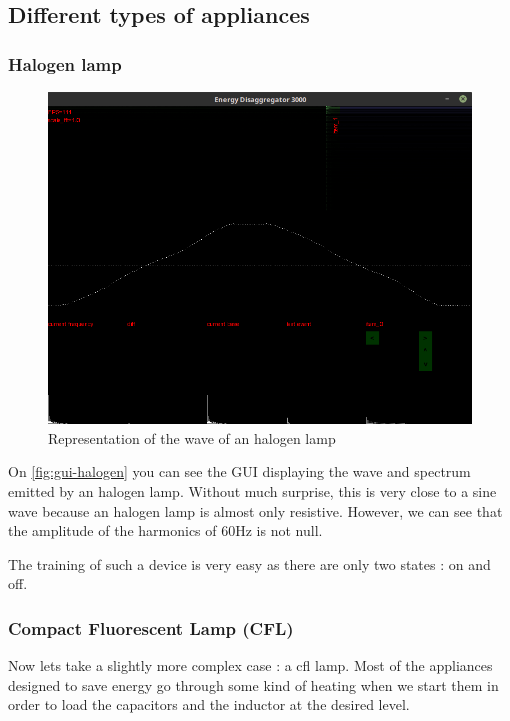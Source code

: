 \subsection{Different types of appliances}\label{section:appliances}
\subsubsection{Halogen lamp}
\begin{figure}
    \centering
    \includegraphics[trim={0 7cm 0 7cm},clip,width=\textwidth,decodearray={1 0 1 0 1 0}]{img/gui-halogen.png}
    \caption{Representation of the wave of an halogen lamp}
    \label{fig:gui-halogen}
\end{figure}
On \autoref{fig:gui-halogen} you can see the GUI displaying the wave and spectrum emitted by an halogen lamp. Without much surprise, this is very close to a sine wave because an halogen lamp is almost only resistive. However, we can see that the amplitude of the harmonics of 60Hz is not null.

The training of such a device is very easy as there are only two states : on and off.

\subsubsection{Compact Fluorescent Lamp (CFL)}
Now lets take a slightly more complex case : a \acrshort{cfl} lamp. Most of the appliances designed to save energy go through some kind of heating when we start them in order to load the capacitors and the inductor at the desired level.

